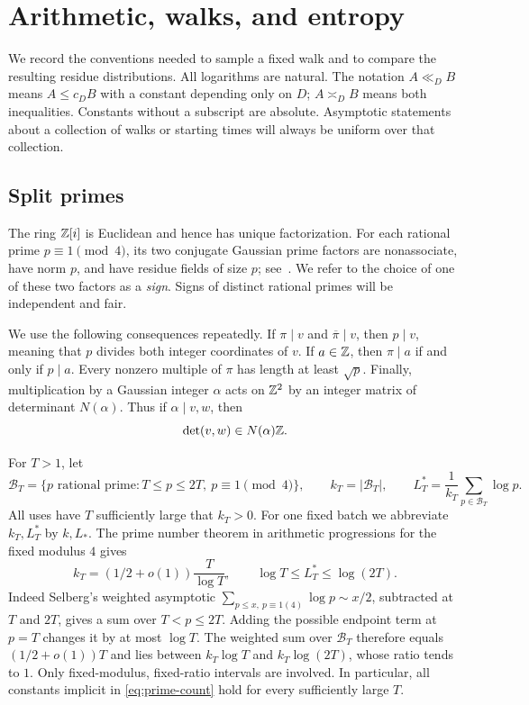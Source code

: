 \section{Arithmetic, walks, and entropy}\label{sec:preliminaries}

We record the conventions needed to sample a fixed walk and to compare
the resulting residue distributions. All logarithms are natural.
The notation \(A\ll_D B\) means \(A\le c_D B\) with a constant depending
only on \(D\); \(A\asymp_D B\) means both inequalities.
Constants without a subscript are absolute. Asymptotic statements about
a collection of walks or starting times will always be uniform over
that collection.

\subsection{Split primes}

The ring \(\mathbb Z[i]\) is Euclidean and hence has unique factorization.
For each rational prime \(p\equiv1\pmod4\), its two conjugate Gaussian
prime factors are nonassociate, have norm \(p\), and have residue fields
of size \(p\); see~\cite[Corollary 7.9 and Theorems 7.14, 9.7, 9.9]{Conrad}.
We refer to the choice of one of these two factors as a \emph{sign}.
Signs of distinct rational primes will be independent and fair.

We use the following consequences repeatedly. If \(\pi\mid v\) and
\(\overline\pi\mid v\), then \(p\mid v\), meaning that \(p\) divides both
integer coordinates of \(v\). If \(a\in\mathbb Z\), then
\(\pi\mid a\) if and only if \(p\mid a\).
Every nonzero multiple of \(\pi\) has length at least \(\sqrt p\).
Finally, multiplication by a Gaussian integer \(\alpha\) acts on
\(\mathbb Z^2\) by an integer matrix of determinant \(N(\alpha)\). Thus if
\(\alpha\mid v,w\), then
\[
\det(v,w)\in N(\alpha)\mathbb Z.
\]

For \(T>1\), let
\[
\mathcal B_T=\{p\text{ rational prime}:T\le p\le2T,\ p\equiv1\pmod4\},
\qquad k_T=|\mathcal B_T|,
\qquad L_T^*=\frac1{k_T}\sum_{p\in\mathcal B_T}\log p.
\]
All uses have \(T\) sufficiently large that \(k_T>0\).
For one fixed batch we abbreviate \(k_T,L_T^*\) by \(k,L_*\).
The prime number theorem in arithmetic progressions for the fixed
modulus \(4\) gives~\cite[Equations (1.1)--(1.2), p.~66]{Selberg}
\begin{equation}\label{eq:prime-count}
k_T=(1/2+o(1))\frac{T}{\log T},
\qquad \log T\le L_T^*\le\log(2T).
\end{equation}
Indeed Selberg's weighted asymptotic
\(\sum_{p\le x,\ p\equiv1(4)}\log p\sim x/2\), subtracted at \(T\)
and \(2T\), gives a sum over \(T<p\le2T\). Adding the possible
endpoint term at \(p=T\) changes it by at most \(\log T\). The weighted
sum over \(\mathcal B_T\) therefore equals \((1/2+o(1))T\) and lies
between \(k_T\log T\) and \(k_T\log(2T)\), whose ratio tends to \(1\).
Only fixed-modulus, fixed-ratio intervals are involved. In particular,
all constants implicit in \eqref{eq:prime-count} hold for every
sufficiently large \(T\).

